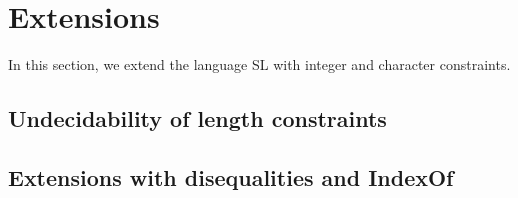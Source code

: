 \section{Extensions}

In this section, we extend the language SL with integer and character constraints. 

\subsection{Undecidability of length constraints}

\subsection{Extensions with disequalities and IndexOf}